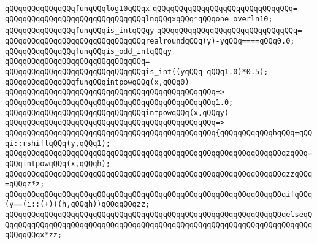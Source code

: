 \newline
\newline
\verb|qQQqqQQqqQQqqQQqfunqQQqlog10qQQqx|\newline
\verb|qQQqqQQqqQQqqQQqqQQqqQQqqQQqqQQq=|\newline
\verb|qQQqqQQqqQQqqQQqqQQqqQQqqQQqqQQqlnqQQqxqQQq*qQQqone_overln10;|\newline
\newline
\newline
\verb|qQQqqQQqqQQqqQQqfunqQQqis_intqQQqy|\newline
\verb|qQQqqQQqqQQqqQQqqQQqqQQqqQQqqQQq=|\newline
\verb|qQQqqQQqqQQqqQQqqQQqqQQqqQQqqQQqrealroundqQQq(y)-yqQQq====qQQq0.0;|\newline
\newline
\newline
\verb|qQQqqQQqqQQqqQQqfunqQQqis_odd_intqQQqy|\newline
\verb|qQQqqQQqqQQqqQQqqQQqqQQqqQQqqQQq=|\newline
\verb|qQQqqQQqqQQqqQQqqQQqqQQqqQQqqQQqis_int((yqQQq-qQQq1.0)*0.5);|\newline
\newline
\newline
\verb|qQQqqQQqqQQqqQQqfunqQQqintpowqQQq(x,qQQq0)|\newline
\verb|qQQqqQQqqQQqqQQqqQQqqQQqqQQqqQQqqQQqqQQqqQQqqQQq=>|\newline
\verb|qQQqqQQqqQQqqQQqqQQqqQQqqQQqqQQqqQQqqQQqqQQqqQQq1.0;|\newline
\newline
\verb|qQQqqQQqqQQqqQQqqQQqqQQqqQQqqQQqintpowqQQq(x,qQQqy)|\newline
\verb|qQQqqQQqqQQqqQQqqQQqqQQqqQQqqQQqqQQqqQQqqQQqqQQq=>|\newline
\verb|qQQqqQQqqQQqqQQqqQQqqQQqqQQqqQQqqQQqqQQqqQQqqQQq{qQQqqQQqqQQqhqQQq=qQQqi::rshiftqQQq(y,qQQq1);|\newline
\verb|qQQqqQQqqQQqqQQqqQQqqQQqqQQqqQQqqQQqqQQqqQQqqQQqqQQqqQQqqQQqqQQqzqQQq=qQQqintpowqQQq(x,qQQqh);|\newline
\verb|qQQqqQQqqQQqqQQqqQQqqQQqqQQqqQQqqQQqqQQqqQQqqQQqqQQqqQQqqQQqqQQqzzqQQq=qQQqz*z;|\newline
\newline
\verb|qQQqqQQqqQQqqQQqqQQqqQQqqQQqqQQqqQQqqQQqqQQqqQQqqQQqqQQqqQQqqQQqifqQQq(y==(i::(+))(h,qQQqh))qQQqqQQqzz;|\newline
\verb|qQQqqQQqqQQqqQQqqQQqqQQqqQQqqQQqqQQqqQQqqQQqqQQqqQQqqQQqqQQqqQQqelseqQQqqQQqqQQqqQQqqQQqqQQqqQQqqQQqqQQqqQQqqQQqqQQqqQQqqQQqqQQqqQQqqQQqqQQqqQQqqQQqx*zz;|\newline
